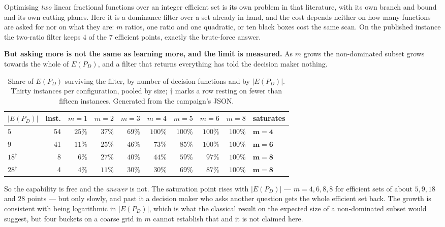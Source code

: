 \documentclass[11pt,a4paper]{article}
\newcommand{\Dset}{D}
\newcommand{\E}{E(P_{\Dset})}
\begin{document}
Optimising \emph{two} linear fractional functions over an integer efficient set
is its own problem in that literature, with its own branch and bound and its
own cutting planes.  Here it is a dominance filter over a set already in hand,
and the cost depends neither on how many functions are asked for nor on what
they are: $m$ ratios, one ratio and one quadratic, or ten black boxes cost the
same scan.  On the published instance the two-ratio filter keeps $4$ of the $7$
efficient points, exactly the brute-force answer.

\textbf{But asking more is not the same as learning more, and the limit is
measured.}  As $m$ grows the non-dominated subset grows towards the whole of
$\E$, and a filter that returns everything has told the decision maker nothing.

\begin{table}[h]
\centering
\caption{Share of $\E$ surviving the filter, by number of decision functions
and by $|\E|$.  Thirty instances per configuration, pooled by size; $\dagger$
marks a row resting on fewer than fifteen instances.  Generated from the
campaign's JSON.}
\label{tab:filter}
\small
\begin{tabular}{lrrrrrrrrl}
\toprule
$|\E|$ & inst. & $m{=}1$ & $m{=}2$ & $m{=}3$ & $m{=}4$ & $m{=}5$ & $m{=}6$ &
$m{=}8$ & saturates \\
\midrule
$5$ & 54 & $25\%$ & $37\%$ & $69\%$ & $100\%$ & $100\%$ & $100\%$ & $100\%$ & $\mathbf{m=4}$ \\
$9$ & 41 & $11\%$ & $25\%$ & $46\%$ & $73\%$ & $85\%$ & $100\%$ & $100\%$ & $\mathbf{m=6}$ \\
$18$$^{\dagger}$ & 8 & $6\%$ & $27\%$ & $40\%$ & $44\%$ & $59\%$ & $97\%$ & $100\%$ & $\mathbf{m=8}$ \\
$28$$^{\dagger}$ & 4 & $4\%$ & $11\%$ & $30\%$ & $30\%$ & $69\%$ & $87\%$ & $100\%$ & $\mathbf{m=8}$ \\
\bottomrule
\end{tabular}
\end{table}

\noindent
So the capability is free and the \emph{answer} is not.  The saturation point
rises with $|\E|$ --- $m = 4, 6, 8, 8$ for efficient sets of about $5, 9, 18$
and $28$ points --- but only slowly, and past it a decision maker who asks
another question gets the whole efficient set back.  The growth is consistent
with being logarithmic in $|\E|$, which is what the classical result on the
expected size of a non-dominated subset would suggest, but four buckets on a
coarse grid in $m$ cannot establish that and it is not claimed here.
\end{document}
